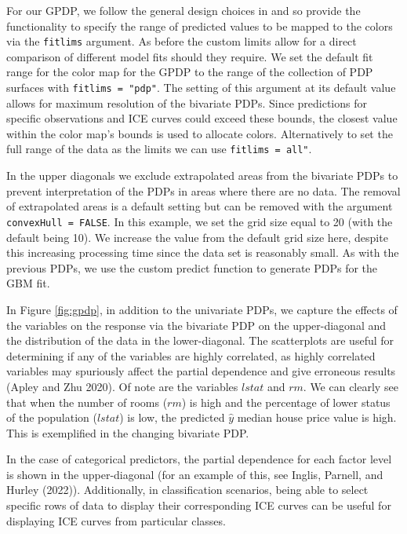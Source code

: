 For our GPDP, we follow the general design choices in  and so provide the functionality to specify the range of predicted values to be mapped to the colors via the \texttt{fitlims} argument. As before the custom limits allow for a direct comparison of different model fits should they require. We set the default fit range for the color map for the GPDP to the range of the collection of PDP surfaces with \texttt{fitlims\ =\ "pdp"}. The setting of this argument at its default value allows for maximum resolution of the bivariate PDPs. Since predictions for specific observations and ICE curves could exceed these bounds, the closest value within the color map's bounds is used to allocate colors. Alternatively to set the full range of the data as the limits we can use \texttt{fitlims\ =\ \textquotesingle{}all"}.

In the upper diagonals we exclude extrapolated areas from the bivariate PDPs to prevent interpretation of the PDPs in areas where there are no data. The removal of extrapolated areas is a default setting but can be removed with the argument \texttt{convexHull\ =\ FALSE}. In this example, we set the grid size equal to 20 (with the default being 10). We increase the value from the default grid size here, despite this increasing processing time since the data set is reasonably small. As with the previous PDPs, we use the custom predict function to generate PDPs for the GBM fit.

In Figure \ref{fig:gpdp}, in addition to the univariate PDPs, we capture the effects of the variables on the response via the bivariate PDP on the upper-diagonal and the distribution of the data in the lower-diagonal. The scatterplots are useful for determining if any of the variables are highly correlated, as highly correlated variables may spuriously affect the partial dependence and give erroneous results (Apley and Zhu 2020). Of note are the variables \(lstat\) and \(rm\). We can clearly see that when the number of rooms (\(rm\)) is high and the percentage of lower status of the population (\(lstat\)) is low, the predicted \(\hat{y}\) median house price value is high. This is exemplified in the changing bivariate PDP.

In the case of categorical predictors, the partial dependence for each factor level is shown in the upper-diagonal (for an example of this, see Inglis, Parnell, and Hurley (2022)). Additionally, in classification scenarios, being able to select specific rows of data to display their corresponding ICE curves can be useful for displaying ICE curves from particular classes.

